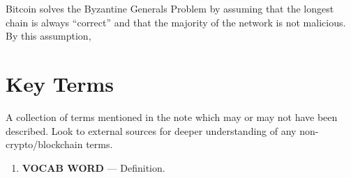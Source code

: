 \documentclass[full.tex]{subfiles}
\begin{document}
    Bitcoin solves the Byzantine Generals Problem by assuming that the longest chain is always ``correct'' and that the majority of the network is not malicious. By this assumption, 
    
    
    
    
    
    
    \newpage
    \thispagestyle{firstpage}
    \vspace*{2\baselineskip}
    \section*{Key Terms}
    \noindent A collection of terms mentioned in the note which may or may not have been described. Look to external sources for deeper understanding of any non-crypto/blockchain terms.
    \begin{enumerate}
        \item \textbf{VOCAB WORD} --- Definition. %
    \end{enumerate}
\end{document}
